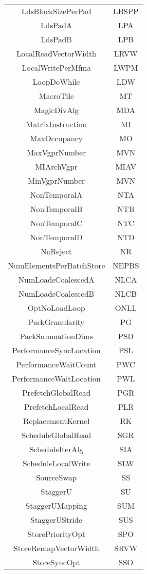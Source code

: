 \documentclass[]{article}
\begin{document}
\begin{center}
\begin{small}
\begin{longtable}{ |c|c| }
 LdsBlockSizePerPad & LBSPP \\
 LdsPadA & LPA \\
 LdsPadB & LPB \\
 LocalReadVectorWidth & LRVW \\
 LocalWritePerMfma & LWPM \\
 LoopDoWhile & LDW \\
 MacroTile & MT \\
 MagicDivAlg & MDA \\
 MatrixInstruction & MI \\
 MaxOccupancy & MO \\
 MaxVgprNumber & MVN \\
 MIArchVgpr & MIAV \\
 MinVgprNumber & MVN \\
 NonTemporalA & NTA \\
 NonTemporalB & NTB \\
 NonTemporalC & NTC \\
 NonTemporalD & NTD \\
 NoReject & NR \\
 NumElementsPerBatchStore & NEPBS \\
 NumLoadsCoalescedA & NLCA \\
 NumLoadsCoalescedB & NLCB \\
 OptNoLoadLoop & ONLL \\
 PackGranularity & PG \\
 PackSummationDims & PSD \\
 PerformanceSyncLocation & PSL \\
 PerformanceWaitCount & PWC \\
 PerformanceWaitLocation & PWL \\
 PrefetchGlobalRead & PGR \\
 PrefetchLocalRead & PLR \\
 ReplacementKernel & RK \\
 ScheduleGlobalRead & SGR \\
 ScheduleIterAlg & SIA \\
 ScheduleLocalWrite & SLW \\
 SourceSwap & SS \\
 StaggerU & SU \\
 StaggerUMapping & SUM \\
 StaggerUStride & SUS \\
 StorePriorityOpt & SPO \\
 StoreRemapVectorWidth & SRVW \\
 StoreSyncOpt & SSO \\

\end{longtable}
\end{small}
\end{center}
\end{document}

